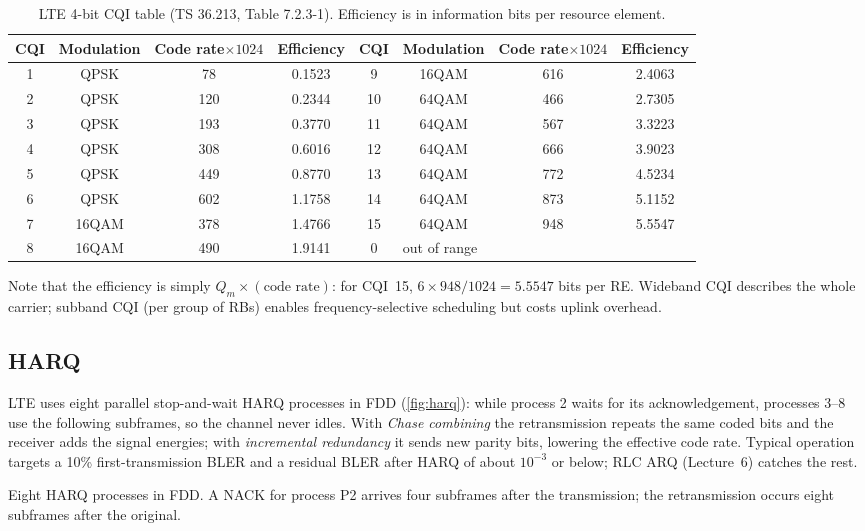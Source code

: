 \documentclass[11pt,a4paper]{article}
\begin{document}
\begin{table}[htbp]
\centering\small
\caption{LTE 4-bit CQI table (TS 36.213, Table 7.2.3-1). Efficiency is in information bits per
resource element.}\label{tab:cqi}
\begin{tabular}{@{}cccc|cccc@{}}
\toprule
\rowcolor{white}CQI & Modulation & Code rate$\times1024$ & Efficiency & CQI & Modulation & Code rate$\times1024$ & Efficiency \\
\midrule
1 & QPSK & 78  & 0.1523 & 9  & 16QAM & 616 & 2.4063 \\
2 & QPSK & 120 & 0.2344 & 10 & 64QAM & 466 & 2.7305 \\
3 & QPSK & 193 & 0.3770 & 11 & 64QAM & 567 & 3.3223 \\
4 & QPSK & 308 & 0.6016 & 12 & 64QAM & 666 & 3.9023 \\
5 & QPSK & 449 & 0.8770 & 13 & 64QAM & 772 & 4.5234 \\
6 & QPSK & 602 & 1.1758 & 14 & 64QAM & 873 & 5.1152 \\
7 & 16QAM & 378 & 1.4766 & 15 & 64QAM & 948 & 5.5547 \\
8 & 16QAM & 490 & 1.9141 & 0  & \multicolumn{3}{l}{out of range} \\
\bottomrule
\end{tabular}
\end{table}

Note that the efficiency is simply $Q_m \times (\text{code rate})$: for CQI~15,
$6\times948/1024 = 5.5547$ bits per RE. Wideband CQI describes the whole carrier; subband CQI (per
group of RBs) enables frequency-selective scheduling but costs uplink overhead.

\subsection{HARQ}
LTE uses eight parallel stop-and-wait HARQ processes in FDD (\cref{fig:harq}): while process 2
waits for its acknowledgement, processes 3--8 use the following subframes, so the channel never
idles. With \emph{Chase combining} the retransmission repeats the same coded bits and the receiver
adds the signal energies; with \emph{incremental redundancy} it sends new parity bits, lowering the
effective code rate. Typical operation targets a 10\% first-transmission BLER and a residual BLER
after HARQ of about $10^{-3}$ or below; RLC ARQ (Lecture~6) catches the rest.

\begin{acnfigure}
  \caption{Eight HARQ processes in FDD. A NACK for process P2 arrives four subframes after the
  transmission; the retransmission occurs eight subframes after the original.}
  \label{fig:harq}
\end{acnfigure}
\end{document}
